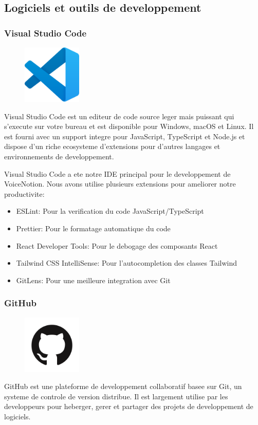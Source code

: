 \subsection{Logiciels et outils de developpement}

\subsubsection{Visual Studio Code}
\begin{figure}
    \centering
    \includegraphics[width=0.25\textwidth]{assets/docs/vscode.png}
\end{figure}
Visual Studio Code est un editeur de code source leger mais puissant qui s'execute sur votre bureau et est disponible pour Windows, macOS et Linux. Il est fourni avec un support integre pour JavaScript, TypeScript et Node.js et dispose d'un riche ecosysteme d'extensions pour d'autres langages et environnements de developpement.

Visual Studio Code a ete notre IDE principal pour le developpement de VoiceNotion. Nous avons utilise plusieurs extensions pour ameliorer notre productivite:

\begin{itemize}
    \item ESLint: Pour la verification du code JavaScript/TypeScript
    \item Prettier: Pour le formatage automatique du code
    \item React Developer Tools: Pour le debogage des composants React
    \item Tailwind CSS IntelliSense: Pour l'autocompletion des classes Tailwind
    \item GitLens: Pour une meilleure integration avec Git
\end{itemize}

\subsubsection{GitHub}
\begin{figure}
    \centering
    \includegraphics[width=0.25\textwidth]{assets/docs/github.png}
\end{figure}
GitHub est une plateforme de developpement collaboratif basee sur Git, un systeme de controle de version distribue. Il est largement utilise par les developpeurs pour heberger, gerer et partager des projets de developpement de logiciels.

